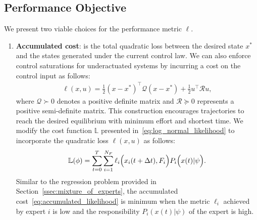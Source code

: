 \subsection{Performance Objective}
\label{ssec:performance_objective}
%
We present two viable choices for the performance metric $\ell$. 
\begin{enumerate}
    \item \textbf{Accumulated cost}: is the total quadratic loss between the
    desired state $x^*$ and the states generated under the current control law.
    We can also enforce control saturations for underactuated systems by incurring a
    cost on the control input as follows:
    \begin{equation}
        \begin{gathered}
            \ell(x, u) = \frac{1}{2}(x - x^*)^\top \mathcal{Q} (x - x^*) + \frac{1}{2} u^\top \mathcal{R} u , 
        \end{gathered}
    \label{eq:accumulatedLoss}
    \end{equation}
    \noindent where $\mathcal{Q} \succ 0$ denotes a positive definite matrix and
    $\mathcal{R} \succeq 0$ represents a positive semi-definite matrix.
    This construction encourages trajectories to reach the desired equilibrium
    with minimum effort and shortest time.
    We modify the cost function $\mathbb{L}$ presented
    in~\eqref{eq:log_normal_likelihood} to incorporate the quadratic loss
    $\ell(x, u)$ as follows:
    \begin{align}
        \mathbb{L}(\phi) = \sum_{t=0}^{T} \sum_{i=1}^{N_F} \ell_i \Bigl(x_i(t+\Delta t), F_i \Bigr) P_i\Bigl(x(t) | \psi \Bigr)  .
        \label{eq:accumulated_likelihood}
    \end{align}
    Similar to the regression problem provided in
    Section~\ref{ssec:mixture_of_experts}, the accumulated
    cost~\eqref{eq:accumulated_likelihood} is minimum when the metric $\ell_i$
    achieved by expert $i$ is low and the responsibility $P_i(x(t) | \psi)$ of
    the expert is high.


\end{enumerate}
